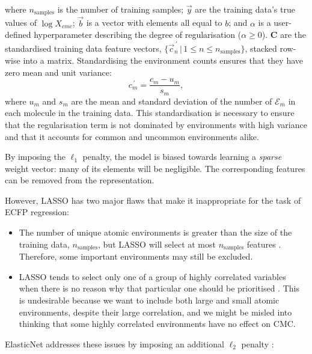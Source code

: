 where $n_{\text{samples}}$ is the number of training samples; $\vec{y}$ are the training data's true values of $\log X_{cmc}$; $\vec{b}$ is a vector with elements all equal to $b$; and $\alpha$ is a user-defined hyperparameter
describing the degree of regularisation ($\alpha \geq 0$). $\mathbf{C}$ are the standardised training data feature vectors, $\{\vec{c}^{\,\prime}_n \,|\, 1 \leq n \leq n_\text{samples}\}$, stacked row-wise into a matrix. Standardising the environment counts ensures that they have zero mean and unit variance:
\begin{equation}
    \label{eq:standard-scaling}
    {c}^{\,\prime}_m = \frac{c_m - u_m}{s_m},
\end{equation}
where $u_m$ and $s_m$ are the mean and standard deviation of the number of $\mathcal{E}_m$ in each molecule in the training data. This standardisation is necessary to ensure that the regularisation term is not dominated by
environments with high variance and that it accounts for common and uncommon environments alike.

By imposing the $\ell_1$ penalty, the model is biased towards learning a \emph{sparse} weight vector: many of its elements will be negligible. The corresponding features can be removed from the representation.

However, LASSO has two major flaws that make it inappropriate for the task of ECFP regression:

\begin{itemize}
    \item The number of unique atomic environments is greater than the size of the training data, $n_\text{samples}$, but LASSO will select at most $n_\text{samples}$ features \cite{efronLeastAngleRegression2004}.
          Therefore, some important environments may still be excluded.
    \item LASSO tends to select only one of a group of highly correlated
          variables when there is no reason why that particular one should be
          prioritised \cite{zouRegularizationVariableSelection2005}. This is
          undesirable because we want to include both large and small atomic
          environments, despite their large correlation, and we might be misled into
          thinking that some highly correlated environments have no effect on CMC.
\end{itemize}

ElasticNet addresses these issues by imposing an additional $\ell_2$ penalty
\cite{zouRegularizationVariableSelection2005}:

